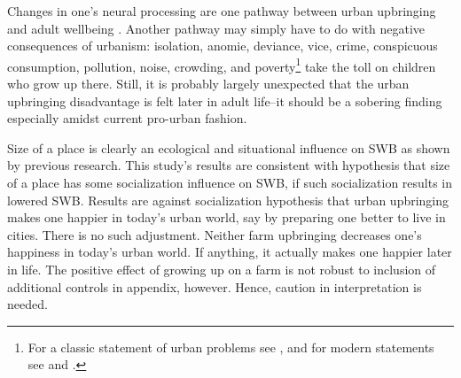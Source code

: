 \documentclass[10pt, letterpaper]{article}
\begin{document}
\begin{spacing}{2.0}

Changes in one's neural processing are one pathway between urban upbringing and
adult wellbeing \citep{lederbogen11}. Another pathway may simply have to do
with negative consequences of urbanism: isolation, anomie, deviance, vice,
crime, conspicuous consumption, pollution, noise, crowding, and
poverty\footnote{For a classic statement of urban problems see
  \citet{wirth38,park15,park84,tonnies57,simmel03}, and for modern
  statements see \citet{white77} and \citet{aokCityBook15}.} take the
toll on children who grow up there. Still, it is probably largely unexpected
that  the urban upbringing disadvantage is felt later in adult life--it should
be a sobering finding especially amidst current pro-urban fashion.

Size of a place is clearly an ecological and situational influence on SWB as shown by
previous research. This study's results are consistent with hypothesis that size
of a place has some  socialization influence on SWB, if such socialization results in lowered SWB.
Results are against socialization %
hypothesis that urban upbringing   
makes  one  happier in today's urban world, say by preparing one better to live
in cities. There is no such adjustment. Neither
farm upbringing decreases one's happiness in today's urban world. If anything,
it actually makes one happier later in life.
The positive effect of growing up on a farm is
not robust to inclusion of additional controls in appendix, however. Hence,
caution in interpretation is needed.


\end{spacing}
\end{document}

